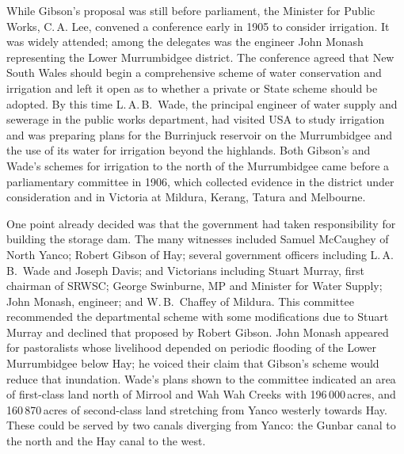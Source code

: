 While Gibson's proposal was still before parliament, the Minister for
Public Works, C.\,A. Lee,  convened a conference
early in 1905 to consider irrigation.  It was widely attended; among
the delegates was the engineer John Monash
representing the Lower Murrumbidgee district.  The conference agreed
that New South Wales should begin a comprehensive scheme of water
conservation and irrigation and left it open as to whether a private
or State scheme should be adopted.  By this time L.\,A.\,B.~Wade, the principal engineer of water supply and
sewerage in the public works department, had visited USA to
study irrigation and was preparing plans for the Burrinjuck
reservoir  on
the Murrumbidgee and the use of its water for irrigation beyond the
highlands.  Both Gibson's and Wade's schemes for irrigation to the
north of the Murrumbidgee came before a parliamentary committee in
1906, which collected evidence in the district under consideration and
in Victoria at Mildura, Kerang, Tatura and Melbourne.

One point already decided was that the government had taken
responsibility for building the storage dam.
The many witnesses included Samuel McCaughey of North Yanco; Robert
Gibson of Hay; several government officers including L.\,A.\,B.~Wade
and Joseph Davis; and Victorians including Stuart Murray, first
chairman of SRWSC; George Swinburne, MP and Minister for Water Supply;
John Monash, engineer; and W.\,B.~Chaffey of Mildura. This committee
recommended the departmental scheme with some modifications due to
Stuart Murray and declined that proposed by Robert Gibson.  John
Monash appeared for pastoralists whose livelihood depended on periodic
flooding of the Lower Murrumbidgee below Hay; he voiced
their claim that Gibson's scheme would reduce that inundation.  Wade's
plans shown to the committee indicated an area of first-class land
north of Mirrool and Wah Wah Creeks with 196\,000\,acres, and
160\,870\,acres of second-class land stretching from Yanco westerly
towards Hay. These could be served by two
canals diverging from Yanco: the Gunbar canal
 to the north and the Hay canal 
to the west.

